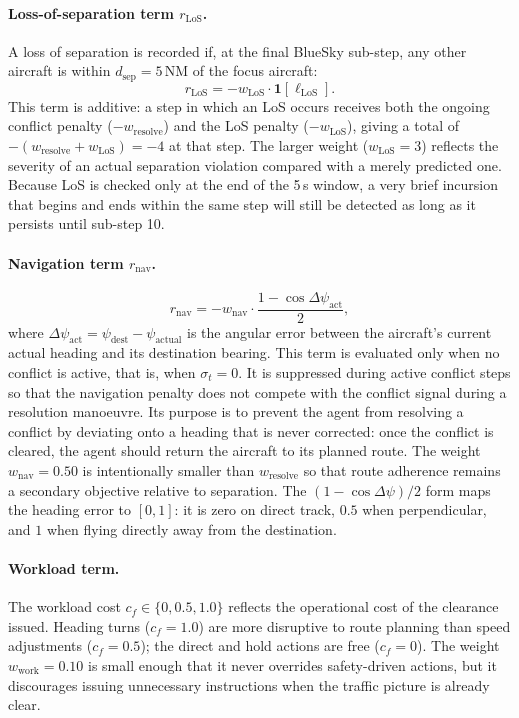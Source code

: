 \documentclass[11pt, a4paper]{article}
\begin{document}
\paragraph{Loss-of-separation term $r_\text{LoS}$.}
A loss of separation is recorded if, at the final BlueSky sub-step, any
other aircraft is within $d_\text{sep} = 5$\,NM of the focus aircraft:
\begin{equation}
    r_\text{LoS} = -w_\text{LoS} \cdot \mathbf{1}[\ell_\text{LoS}].
    \label{eq:r_los}
\end{equation}
This term is additive: a step in which an LoS occurs receives both the ongoing
conflict penalty ($-w_\text{resolve}$) and the LoS penalty ($-w_\text{LoS}$),
giving a total of $-(w_\text{resolve} + w_\text{LoS}) = -4$ at that step.
The larger weight ($w_\text{LoS} = 3$) reflects the severity of an actual
separation violation compared with a merely predicted one.
Because LoS is checked only at the end of the 5\,s window, a very brief
incursion that begins and ends within the same step will still be detected
as long as it persists until sub-step 10.

\paragraph{Navigation term $r_\text{nav}$.}
\begin{equation}
    r_\text{nav} = -w_\text{nav} \cdot \frac{1 - \cos\Delta\psi_\text{act}}{2},
    \label{eq:r_nav}
\end{equation}
where $\Delta\psi_\text{act} = \psi_\text{dest} - \psi_\text{actual}$ is the
angular error between the aircraft's current actual heading and its destination
bearing.
This term is evaluated only when no conflict is active, that is, when
$\sigma_t = 0$.
It is suppressed during active conflict steps so that the navigation penalty
does not compete with the conflict signal during a resolution manoeuvre.
Its purpose is to prevent the agent from resolving a conflict by deviating onto
a heading that is never corrected: once the conflict is cleared, the agent
should return the aircraft to its planned route.
The weight $w_\text{nav} = 0.50$ is intentionally smaller than $w_\text{resolve}$
so that route adherence remains a secondary objective relative to separation.
The $(1 - \cos\Delta\psi)/2$ form maps the heading error to $[0, 1]$:
it is zero on direct track, $0.5$ when perpendicular, and $1$ when flying
directly away from the destination.

\paragraph{Workload term.}
The workload cost $c_f \in \{0, 0.5, 1.0\}$ reflects the operational cost of
the clearance issued.
Heading turns ($c_f = 1.0$) are more disruptive to route planning than speed
adjustments ($c_f = 0.5$); the direct and hold actions are free ($c_f = 0$).
The weight $w_\text{work} = 0.10$ is small enough that it never overrides
safety-driven actions, but it discourages issuing unnecessary instructions
when the traffic picture is already clear.
\end{document}
